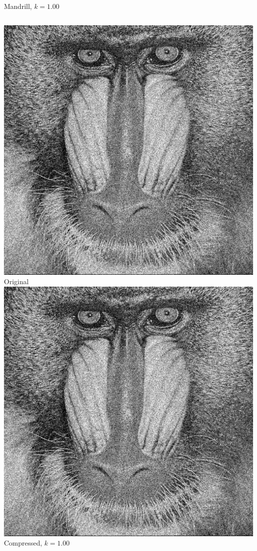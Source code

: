 \documentclass[12pt]{beamer}
\begin{document}
\begin{frame}{Mandrill, \(k=1.00\)}
  \begin{columns}
      \includegraphics[width=\textwidth]{Mandrill.jpg}\\
      \footnotesize Original
      \includegraphics[width=\textwidth]{Mandrill_k100.png}\\
      \footnotesize Compressed, \(k=1.00\)
  \end{columns}
\end{frame}
\end{document}

